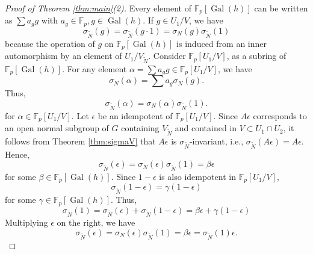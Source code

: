 \documentclass{amsart}
\theoremstyle{plain}
\theoremstyle{definition}
\theoremstyle{plain}
\theoremstyle{plain}
\theoremstyle{plain}
\theoremstyle{remark}
\theoremstyle{remark}
\theoremstyle{plain}
\theoremstyle{definition}
\theoremstyle{plain}
\DeclareMathOperator{\Gal}{\mathrm{Gal}}
\newcounter{main}
\theoremstyle{plain}
\theoremstyle{plain}
\numberwithin{equation}{section}
\begin{document}
\begin{proof}[Proof of Theorem \ref{thm:main}(2)]
Every element of $\mathbb{F}_p[\Gal(h)]$ can be written as $\sum a_gg$ with $a_g \in \mathbb{F}_p, g \in \Gal(h)$. If $g \in U_1/V$, we have 
\begin{equation}
    \sigma_{\widetilde{N}}(g) = \sigma_{\widetilde{N}}(g \cdot 1) = \sigma_N(g)\sigma_{\widetilde{N}}(1)
\end{equation}
because the operation of $g$ on $\mathbb{F}_p[\Gal(h)]$ is induced from an inner automorphism by an element of $U_1/V_{\widetilde{N}}$. Consider $\mathbb{F}_p[U_1/V]$, as a subring of $\mathbb{F}_p[\Gal(h)]$. For any element $\alpha = \sum a_gg \in \mathbb{F}_p[U_1/V]$, we have
\begin{equation}
    \sigma_N(\alpha) = \sum a_g\sigma_N(g).
\end{equation}
Thus,
\begin{equation}
    \sigma_{\widetilde{N}}(\alpha) = \sigma_N(\alpha)\sigma_{\widetilde{N}}(1).
\end{equation}
for $\alpha \in \mathbb{F}_p[U_1/V]$. Let $\epsilon$ be an idempotent of $\mathbb{F}_p[U_1/V]$. Since $A\epsilon$ corresponds to an open normal subgroup of $G$ containing $V_{\widetilde N}$ and contained in $V \subset U_1 \cap U_2$, it follows from Theorem \ref{thm:sigmaV} that $A\epsilon$ is $\sigma_{\widetilde{N}}$-invariant, i.e., $\sigma_{\widetilde{N}}(A\epsilon) = A\epsilon$. Hence, 
\begin{equation}
    \sigma_{\widetilde{N}}(\epsilon) = \sigma_N(\epsilon)\sigma_{\widetilde{N}}(1) = \beta\epsilon
\end{equation}
for some $\beta \in \mathbb{F}_p[\Gal(h)]$. Since $1 - \epsilon$ is also idempotent in $\mathbb{F}_p[U_1/V]$, 
\begin{equation}
    \sigma_{\widetilde{N}}(1 - \epsilon) = \gamma(1 - \epsilon)
\end{equation}
for some $\gamma \in \mathbb{F}_p[\Gal(h)]$. Thus,
\begin{equation}   
    \sigma_{\widetilde{N}}(1) =  \sigma_{\widetilde{N}}(\epsilon) + \sigma_{\widetilde{N}}(1 - \epsilon) = \beta\epsilon + \gamma(1 - \epsilon)
\end{equation}
Multiplying $\epsilon$ on the right, we have 
\begin{equation}
    \sigma_{\widetilde{N}}(\epsilon) = \sigma_{N}(\epsilon)\sigma_{\widetilde{N}}(1) = \beta\epsilon = \sigma_{\widetilde{N}}(1)\epsilon.
\end{equation}

\end{proof}
\end{document}
